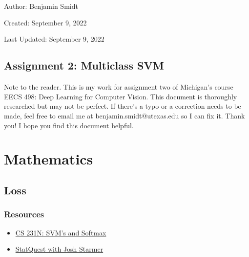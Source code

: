 \documentclass[12pt]{article}
\begin{document}
\noindent Author: Benjamin Smidt

\noindent Created: September 9, 2022

\noindent Last Updated: September 9, 2022
\begin{center}
\section*{Assignment 2: Multiclass SVM}
\end{center}

\paragraph{} Note to the reader. This is my work for assignment two of Michigan's course
EECS 498: Deep Learning for Computer Vision. This document is thoroughly researched but
may not be perfect. If there's a typo or a correction needs to be made, feel free to 
email me at benjamin.smidt@utexas.edu so I can fix it. Thank you! I hope you find this 
document helpful.

\section{Mathematics}
\subsection{Loss}

\subsubsection*{Resources}
\begin{itemize}
    \item \href{https://cs231n.github.io/linear-classify/#svm-vs-softmax}{CS 231N: SVM's and Softmax }
    \item \href{https://www.youtube.com/watch?v=efR1C6CvhmE}{StatQuest with Josh Starmer}
\end{itemize}
\end{document}
